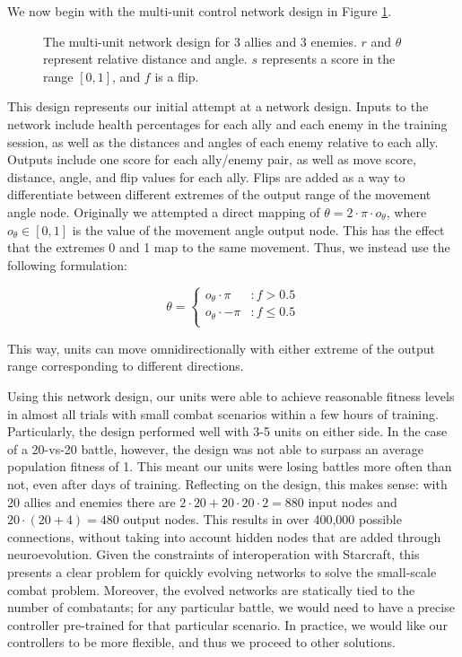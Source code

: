 \documentclass[10pt,a4paper,twocolumn]{article}
\begin{document}
We now begin with the multi-unit control network design in Figure \ref{fig:design_multiunit}.

\begin{figure}

\caption{The multi-unit network design for 3 allies and 3 enemies. $r$ and $\theta$ represent relative distance and angle. $s$ represents a score in the range $[0,1]$, and $f$ is a flip.}
\label{fig:design_multiunit}
\end{figure}

This design represents our initial attempt at a network design. Inputs to the network include health percentages for each ally and each enemy in the training session, as well as the distances and angles of each enemy relative to each ally. Outputs include one score for each ally/enemy pair, as well as move score, distance, angle, and flip values for each ally. Flips are added as a way to differentiate between different extremes of the output range of the movement angle node. Originally we attempted a direct mapping of $\theta = 2 \cdot \pi \cdot o_\theta$, where $o_\theta \in [0,1]$ is the value of the movement angle output node. This has the effect that the extremes 0 and 1 map to the same movement. Thus, we instead use the following formulation:

 \begin{displaymath}
   \theta = \left\{
     \begin{array}{lr}
       o_\theta \cdot \pi & : f > 0.5\\
       o_\theta \cdot -\pi & : f \leq 0.5\\
     \end{array}
   \right.
\end{displaymath}

This way, units can move omnidirectionally with either extreme of the output range corresponding to different directions.

Using this network design, our units were able to achieve reasonable fitness levels in almost all trials with small combat scenarios within a few hours of training. Particularly, the design performed well with 3-5 units on either side. In the case of a 20-vs-20 battle, however, the design was not able to surpass an average population fitness of 1. This meant our units were losing battles more often than not, even after days of training. Reflecting on the design, this makes sense: with 20 allies and enemies there are $2 \cdot 20 + 20\cdot 20 \cdot 2 = 880$ input nodes and $20 \cdot (20 + 4) = 480$ output nodes. This results in over 400,000 possible connections, without taking into account hidden nodes that are added through neuroevolution. Given the constraints of interoperation with Starcraft, this presents a clear problem for quickly evolving networks to solve the small-scale combat problem. Moreover, the evolved networks are statically tied to the number of combatants; for any particular battle, we would need to have a precise controller pre-trained for that particular scenario. In practice, we would like our controllers to be more flexible, and thus we proceed to other solutions.
\end{document}
